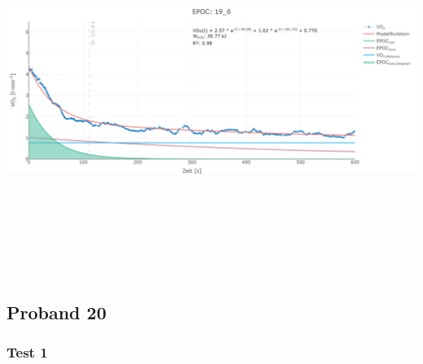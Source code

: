 \documentclass[
  letterpaper,
  DIV=11]{scrartcl}
\begin{document}
\includegraphics[width=11.45833in,height=4.6875in]{images/19_6.png}

\subsection{Proband 20}

\subsubsection{Test 1}
\end{document}
